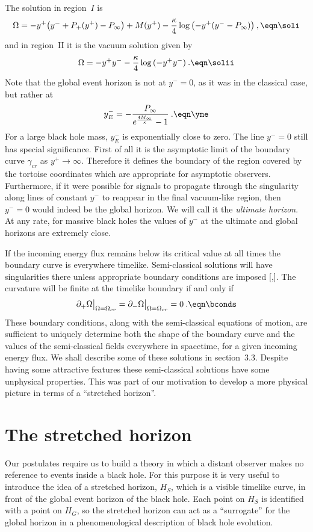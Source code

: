 The solution in region~$I$ is
$$
\Omega = -y^+\bigl(y^-+P_+(y^+)-P_\infty\bigr) + M(y^+)
-{\kappa\over 4}\log{\bigl(-y^+(y^--P_\infty)\bigr)} \>,
\eqn\soli
$$
and in region~II it is the vacuum solution given by
$$
\Omega = -y^+y^- -{\kappa\over 4}\log{(-y^+y^-)} \>.
\eqn\solii
$$
Note that the global event horizon is not at $y^-=0$, as it was in
the classical case, but rather at
$$
y^-_E =
-{P_\infty \over e^{4M_\infty\over \kappa}-1} \>.
\eqn\yme
$$
For a large black hole mass, $y^-_E$ is exponentially close to zero.
The line $y^-=0$ still has special significance.  First of all it is
the asymptotic limit of the boundary curve $\gamma_{cr}$ as
$y^+\rightarrow\infty$.  Therefore it defines the boundary of the
region covered by the tortoise coordinates which are appropriate for
asymptotic observers.  Furthermore, if it were possible for signals
to propagate through the singularity along lines of constant $y^-$ to
reappear in the final vacuum-like region, then $y^-=0$ would indeed
be the global horizon.  We will call it the {\it ultimate horizon}.
At any rate, for massive black holes the values of $y^-$ at the
ultimate and global horizons are extremely close.

If the incoming energy flux remains below its critical value at all
times the boundary curve is everywhere timelike.  Semi-classical
solutions will have singularities there unless appropriate boundary
conditions are imposed [\RSTtwo,\RSTthree].  The curvature will be
finite at the timelike boundary if and only if
$$
\pa_+\Omega\big\vert_{\Omega=\Omega_{cr}}
=\pa_-\Omega\big\vert_{\Omega=\Omega_{cr}}
=0 \>.
\eqn\bconds
$$
These boundary conditions, along with the semi-classical equations of
motion, are sufficient to uniquely determine both the shape of the
boundary curve and the values of the semi-classical fields everywhere
in spacetime, for a given incoming energy flux.  We shall describe
some of these solutions in section~3.3.  Despite having some
attractive features these semi-classical solutions have some
unphysical properties.  This was part of our motivation to develop a
more physical picture in terms of a ``stretched horizon''.

\chapter{The stretched horizon}

Our postulates require us to build a theory in which a distant
observer makes no reference to events inside a black hole.  For this
purpose it is very useful to introduce the idea of a stretched
horizon, $H_S$, which is a visible timelike curve, in front of the
global event horizon of the black hole.  Each point on $H_S$ is
identified with a point on $H_G$, so the stretched horizon can act as
a ``surrogate'' for the global horizon in a phenomenological
description of black hole evolution.

